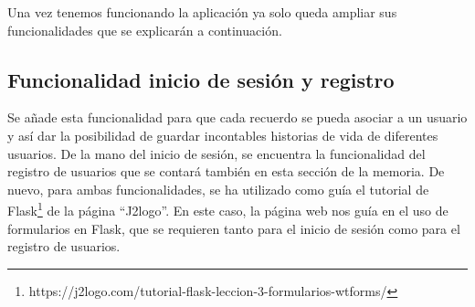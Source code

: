 Una vez tenemos funcionando la aplicación ya solo queda ampliar sus funcionalidades que se explicarán a continuación. 


\subsection{Funcionalidad inicio de sesión y registro}

Se añade esta funcionalidad para que cada recuerdo se pueda asociar a un usuario y así dar la posibilidad de guardar incontables historias de vida de diferentes usuarios. De la mano del inicio de sesión, se encuentra la funcionalidad del registro de usuarios que se contará también en esta sección de la memoria. De nuevo, para ambas funcionalidades, se ha utilizado como guía el tutorial de Flask\footnote{https://j2logo.com/tutorial-flask-leccion-3-formularios-wtforms/} de la página ``J2logo''. En este caso, la página web nos guía en el uso de formularios en Flask, que se requieren tanto para el inicio de sesión como para el registro de usuarios. 






